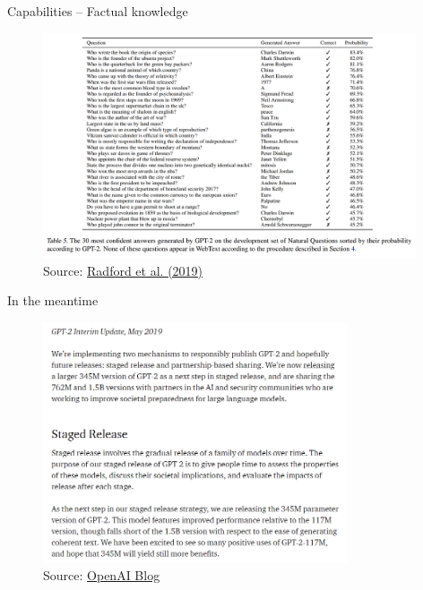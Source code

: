 
\begin{frame}{Capabilities -- Factual knowledge}

\vfill

\begin{figure}
\centering
\includegraphics[width = 11cm]{figure/72-gpt2-qa.png}\\ 
\footnotesize{Source:} \href{https://cdn.openai.com/better-language-models/language_models_are_unsupervised_multitask_learners.pdf}{\footnotesize Radford et al. (2019)}
\end{figure}

\vfill

\end{frame}


\begin{frame}{In the meantime}

\vfill

\begin{figure}
\centering
\includegraphics[width = 9cm]{figure/72-gpt2-release2.png}\\ 
\footnotesize{Source:} \href{https://openai.com/blog/better-language-models/\#sample1}{\footnotesize OpenAI Blog}
\end{figure}

\vfill

\end{frame}

